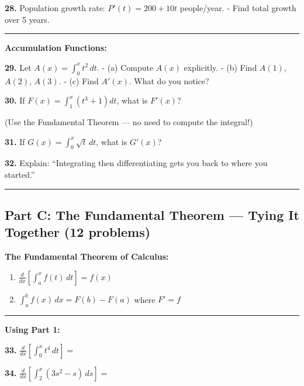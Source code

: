 \documentclass[
  11pt,
]{article}
\begin{document}
\textbf{28.} Population growth rate: \(P'(t) = 200 + 10t\) people/year.
- Find total growth over 5 years.

\begin{center}\rule{0.5\linewidth}{0.5pt}\end{center}

\textbf{Accumulation Functions:}

\textbf{29.} Let \(A(x) = \int_0^x t^2 \, dt\). - (a) Compute \(A(x)\)
explicitly. - (b) Find \(A(1)\), \(A(2)\), \(A(3)\). - (c) Find
\(A'(x)\). What do you notice?

\textbf{30.} If \(F(x) = \int_1^x (t^3 + 1) dt\), what is \(F'(x)\)?

(Use the Fundamental Theorem --- no need to compute the integral!)

\textbf{31.} If \(G(x) = \int_0^x \sqrt{t} \, dt\), what is \(G'(x)\)?

\textbf{32.} Explain: ``Integrating then differentiating gets you back
to where you started.''

\begin{center}\rule{0.5\linewidth}{0.5pt}\end{center}

\hypertarget{part-c-the-fundamental-theorem-tying-it-together-12-problems}{%
\subsection{Part C: The Fundamental Theorem --- Tying It Together (12
problems)}\label{part-c-the-fundamental-theorem-tying-it-together-12-problems}}

\textbf{The Fundamental Theorem of Calculus:}

\begin{enumerate}
\def\labelenumi{\arabic{enumi}.}
\item
  \(\frac{d}{dx}\left[\int_a^x f(t) \, dt\right] = f(x)\)
\item
  \(\int_a^b f(x) \, dx = F(b) - F(a)\) where \(F' = f\)
\end{enumerate}

\begin{center}\rule{0.5\linewidth}{0.5pt}\end{center}

\textbf{Using Part 1:}

\textbf{33.} \(\frac{d}{dx}\left[\int_0^x t^4 \, dt\right] ={}\)

\textbf{34.} \(\frac{d}{dx}\left[\int_2^x (3s^2 - s) \, ds\right] ={}\)
\end{document}
